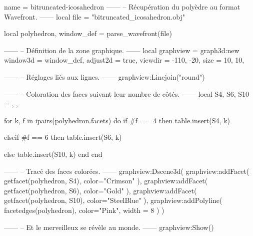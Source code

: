 \documentclass{standalone}
\begin{document}
\begin{luadraw}{name = bitruncated-icosahedron}
------
-- Récupération du polyèdre au format Wavefront.
------
local file = "bitruncated_icosahedron.obj"

local polyhedron, window_def = parse_wavefront(file)

------
-- Définition de la zone graphique.
------
local graphview = graph3d:new{
  window3d = window_def,
  adjust2d = true,
  viewdir  = {-110, -20},
  size     = {10, 10},
}

------
-- Réglages liés aux lignes.
------
graphview:Linejoin("round")

------
-- Coloration des faces suivant leur nombre de côtés.
------
local S4, S6, S10 = {}, {}, {}

for k, f in ipairs(polyhedron.facets) do
  if #f == 4 then
    table.insert(S4, k)

  elseif #f == 6 then
    table.insert(S6, k)

  else
    table.insert(S10, k)
  end
end

------
-- Tracé des faces colorées.
------
graphview:Dscene3d(
  graphview:addFacet(
    getfacet(polyhedron, S4),
    {
      color="Crimson"
    }),
  graphview:addFacet(
    getfacet(polyhedron, S6),
    {
      color="Gold"
    }),
  graphview:addFacet(
    getfacet(polyhedron, S10),
    {
      color="SteelBlue"
    }),
  graphview:addPolyline(
    facetedges(polyhedron),
    {
      color="Pink",
      width = 8
    })
)

------
-- Et le merveilleux se révèle au monde.
------
graphview:Show()
\end{luadraw}
\end{document}
